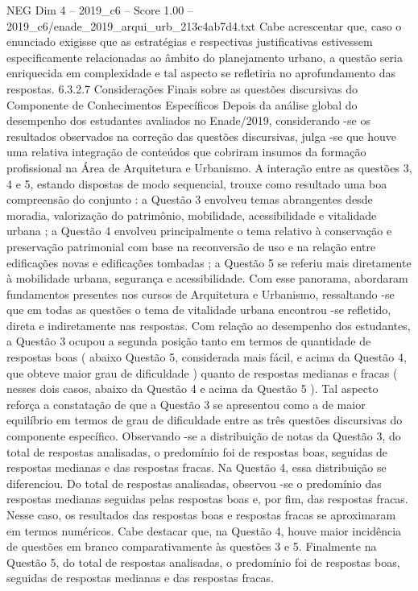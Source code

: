 \begin{textsample}{NEG Dim 4 – 2019\_c6 – Score 1.00 – 2019\_c6/enade\_2019\_arqui\_urb\_213c4ab7d4.txt}
Cabe acrescentar que, caso o enunciado exigisse que as estratégias e respectivas justificativas estivessem especificamente relacionadas ao âmbito do planejamento urbano, a questão seria enriquecida em complexidade e tal aspecto se refletiria no aprofundamento das respostas. 6.3.2.7 Considerações Finais sobre as questões discursivas do Componente de Conhecimentos Específicos Depois da análise global do desempenho dos estudantes avaliados no Enade/2019, considerando -se os resultados observados na correção das questões discursivas, julga -se que houve uma relativa integração de conteúdos que cobriram insumos da formação profissional na Área de Arquitetura e Urbanismo.
A interação entre as questões 3, 4 e 5, estando dispostas de modo sequencial, trouxe como resultado uma boa compreensão do conjunto : a Questão 3 envolveu temas abrangentes desde moradia, valorização do patrimônio, mobilidade, acessibilidade e vitalidade urbana ; a Questão 4 envolveu principalmente o tema relativo à conservação e preservação patrimonial com base na reconversão de uso e na relação entre edificações novas e edificações tombadas ; a Questão 5 se referiu mais diretamente à mobilidade urbana, segurança e acessibilidade.
Com esse panorama, abordaram fundamentos presentes nos cursos de Arquitetura e Urbanismo, ressaltando -se que em todas as questões o tema de vitalidade urbana encontrou -se refletido, direta e indiretamente nas respostas.
Com relação ao desempenho dos estudantes, a Questão 3 ocupou a segunda posição tanto em termos de quantidade de respostas boas ( abaixo Questão 5, considerada mais fácil, e acima da Questão 4, que obteve maior grau de dificuldade ) quanto de respostas medianas e fracas ( nesses dois casos, abaixo da Questão 4 e acima da Questão 5 ).
Tal aspecto reforça a constatação de que a Questão 3 se apresentou como a de maior equilíbrio em termos de grau de dificuldade entre as três questões discursivas do componente específico.
Observando -se a distribuição de notas da Questão 3, do total de respostas analisadas, o predomínio foi de respostas boas, seguidas de respostas medianas e das respostas fracas.
Na Questão 4, essa distribuição se diferenciou.
Do total de respostas analisadas, observou -se o predomínio das respostas medianas seguidas pelas respostas boas e, por fim, das respostas fracas.
Nesse caso, os resultados das respostas boas e respostas fracas se aproximaram em termos numéricos.
Cabe destacar que, na Questão 4, houve maior incidência de questões em branco comparativamente às questões 3 e 5.
Finalmente na Questão 5, do total de respostas analisadas, o predomínio foi de respostas boas, seguidas de respostas medianas e das respostas fracas.

\end{textsample}
